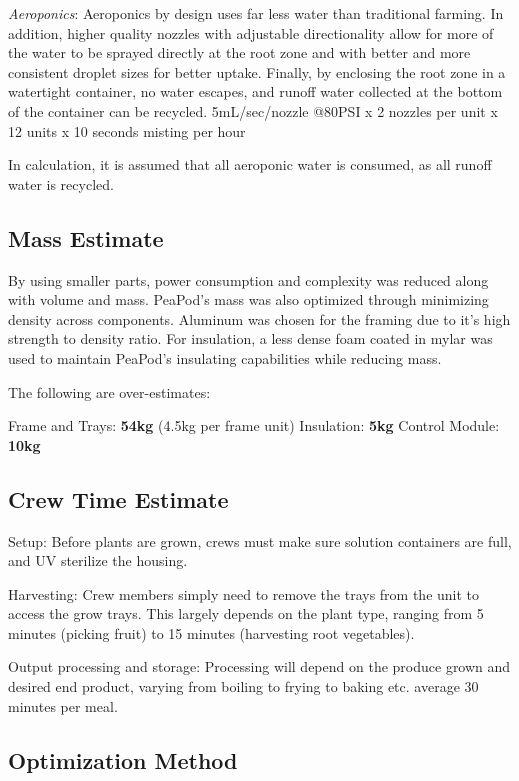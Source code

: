 \documentclass{report}
\begin{document}
\begin{spacing}{0.5}
\textit{Aeroponics}: Aeroponics by design uses far less water than traditional farming. In addition, higher quality nozzles with adjustable directionality allow for more of the water to be sprayed directly at the root zone and with better and more consistent droplet sizes for better uptake. Finally, by enclosing the root zone in a watertight container, no water escapes, and runoff water collected at the bottom of the container can be recycled. 5mL/sec/nozzle @80PSI x 2 nozzles per unit x 12 units x 10 seconds misting per hour

In calculation, it is assumed that all aeroponic water is consumed, as all runoff water is recycled.

\subsection{Mass Estimate}
\label{app:mass}

By using smaller parts, power consumption and complexity was reduced along with volume and mass. PeaPod's mass was also optimized through minimizing density across components. Aluminum was chosen for the framing due to it's high strength to density ratio. For insulation, a less dense foam coated in mylar was used to maintain PeaPod's insulating capabilities while reducing mass.

The following are over-estimates:

Frame and Trays: \textbf{54kg} (4.5kg per frame unit)
Insulation: \textbf{5kg}
Control Module: \textbf{10kg}

\subsection{Crew Time Estimate}
\label{app:crewtime}

Setup: Before plants are grown, crews must make sure solution containers are full, and UV sterilize the housing.

Harvesting: Crew members simply need to remove the trays from the unit to access the grow trays. This largely depends on the plant type, ranging from 5 minutes (picking fruit) to 15 minutes (harvesting root vegetables).

Output processing and storage: Processing will depend on the produce grown and desired end product, varying from boiling to frying to baking etc. average 30 minutes per meal.

\subsection{Optimization Method}
\label{app:optimization}


\end{spacing}
\end{document}
